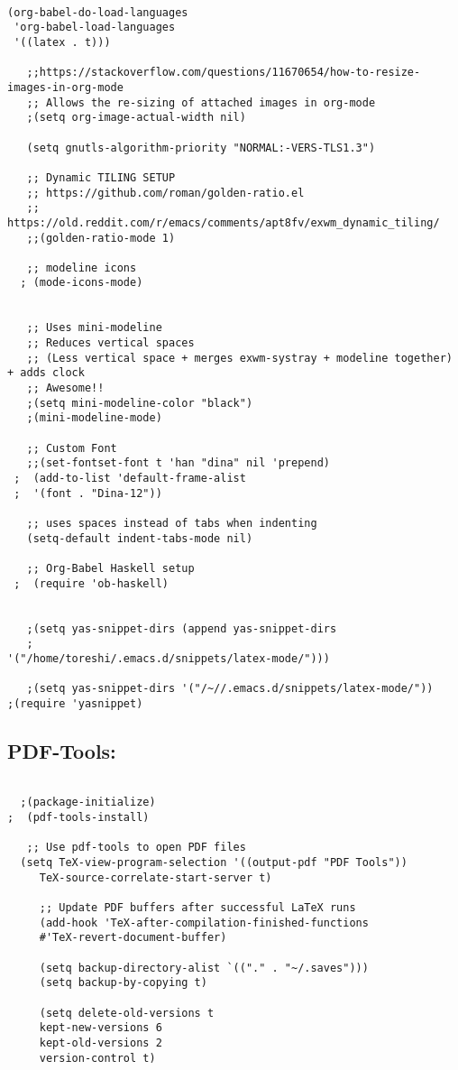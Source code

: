 \documentclass[11pt]{article}
\begin{document}
\begin{verbatim}

(org-babel-do-load-languages
 'org-babel-load-languages
 '((latex . t)))

   ;;https://stackoverflow.com/questions/11670654/how-to-resize-images-in-org-mode
   ;; Allows the re-sizing of attached images in org-mode
   ;(setq org-image-actual-width nil)

   (setq gnutls-algorithm-priority "NORMAL:-VERS-TLS1.3")

   ;; Dynamic TILING SETUP
   ;; https://github.com/roman/golden-ratio.el
   ;; https://old.reddit.com/r/emacs/comments/apt8fv/exwm_dynamic_tiling/
   ;;(golden-ratio-mode 1)

   ;; modeline icons
  ; (mode-icons-mode)


   ;; Uses mini-modeline
   ;; Reduces vertical spaces 
   ;; (Less vertical space + merges exwm-systray + modeline together) + adds clock
   ;; Awesome!!
   ;(setq mini-modeline-color "black")
   ;(mini-modeline-mode)

   ;; Custom Font
   ;;(set-fontset-font t 'han "dina" nil 'prepend)
 ;  (add-to-list 'default-frame-alist
 ;  '(font . "Dina-12"))

   ;; uses spaces instead of tabs when indenting
   (setq-default indent-tabs-mode nil)

   ;; Org-Babel Haskell setup
 ;  (require 'ob-haskell)


   ;(setq yas-snippet-dirs (append yas-snippet-dirs
   ;                            '("/home/toreshi/.emacs.d/snippets/latex-mode/")))

   ;(setq yas-snippet-dirs '("/~//.emacs.d/snippets/latex-mode/"))
;(require 'yasnippet)  
\end{verbatim}

\subsection{PDF-Tools:}
\label{sec:org1d57015}
\begin{verbatim}

  ;(package-initialize)
;  (pdf-tools-install)

   ;; Use pdf-tools to open PDF files
  (setq TeX-view-program-selection '((output-pdf "PDF Tools"))
     TeX-source-correlate-start-server t)

     ;; Update PDF buffers after successful LaTeX runs
     (add-hook 'TeX-after-compilation-finished-functions
     #'TeX-revert-document-buffer)

     (setq backup-directory-alist `(("." . "~/.saves")))
     (setq backup-by-copying t)

     (setq delete-old-versions t
     kept-new-versions 6
     kept-old-versions 2
     version-control t)
\end{verbatim}
\end{document}
